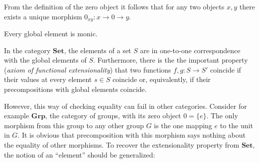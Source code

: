     \begin{property}
        From the definition of the zero object it follows that for any two objects $x,y$ there exists a unique morphism $0_{xy}:x\rightarrow0\rightarrow y$.
    \end{property}

    \begin{property}
        Every global element is monic.
    \end{property}

    \begin{remark}\label{cat:global_elements_remark}
        In the category $\mathbf{Set}$, the elements of a set $S$ are in one-to-one correspondence with the global elements of $S$. Furthermore, there is the the important property (\textit{axiom of functional extensionality}) that two functions $f,g:S\rightarrow S'$ coincide if their values at every element $s\in S$ coincide or, equivalently, if their precompositions with global elements coincide.

        However, this way of checking equality can fail in other categories. Consider for example $\mathbf{Grp}$, the category of groups, with its zero object $0=\{e\}$. The only morphism from this group to any other group $G$ is the one mapping $e$ to the unit in $G$. It is obvious that precomposition with this morphism says nothing about the equality of other morphisms. To recover the extensionality property from $\mathbf{Set}$, the notion of an ``element'' should be generalized:
    \end{remark}

